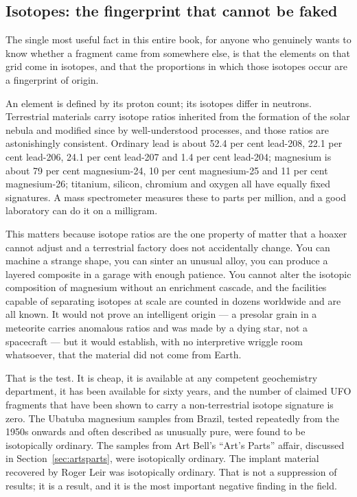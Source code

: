 \subsection{Isotopes: the fingerprint that cannot be faked}

The single most useful fact in this entire book, for anyone who genuinely wants to know whether
a fragment came from somewhere else, is that the elements on that grid come in isotopes, and
that the proportions in which those isotopes occur are a fingerprint of origin.

An element is defined by its proton count; its isotopes differ in neutrons. Terrestrial
materials carry isotope ratios inherited from the formation of the solar nebula and modified
since by well-understood processes, and those ratios are astonishingly consistent. Ordinary
lead is about 52.4 per cent lead-208, 22.1 per cent lead-206, 24.1 per cent lead-207 and 1.4
per cent lead-204; magnesium is about 79 per cent magnesium-24, 10 per cent magnesium-25 and 11
per cent magnesium-26; titanium, silicon, chromium and oxygen all have equally fixed signatures.
A mass spectrometer measures these to parts per million, and a good laboratory can do it on a
milligram.

This matters because isotope ratios are the one property of matter that a hoaxer cannot adjust
and a terrestrial factory does not accidentally change. You can machine a strange shape, you can
sinter an unusual alloy, you can produce a layered composite in a garage with enough patience.
You cannot alter the isotopic composition of magnesium without an enrichment cascade, and the
facilities capable of separating isotopes at scale are counted in dozens worldwide and are all
known.  It would not prove an intelligent origin --- a
presolar grain in a meteorite carries anomalous ratios and was made by a dying star, not a
spacecraft --- but it would establish, with no interpretive wriggle room whatsoever, that the
material did not come from Earth.

That is the test. It is cheap, it is available at any competent geochemistry department, it has
been available for sixty years, and the number of claimed UFO fragments that have been shown to
carry a non-terrestrial isotope signature is zero. The Ubatuba magnesium samples from Brazil,
tested repeatedly from the 1950s onwards and often described as unusually pure, were found to be
isotopically ordinary. The samples from Art Bell's ``Art's Parts'' affair, discussed in
Section~\ref{sec:artsparts}, were isotopically ordinary. The implant material recovered by
Roger Leir was isotopically ordinary.  That is not a suppression of results; it is a result,
and it is the most important negative finding in the field.

